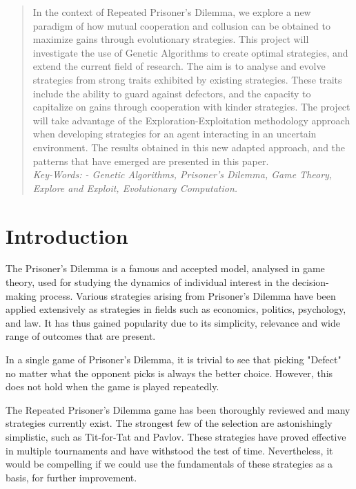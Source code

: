 \documentclass{icldt}
\numberwithin{equation}{section}       %
\begin{document}
	
\begin{abstract}
In the context of Repeated Prisoner's Dilemma, we explore a new paradigm of  how mutual cooperation and collusion can be obtained to maximize gains through evolutionary strategies. This project will investigate the use of Genetic Algorithms to create optimal strategies, and extend the current field of research. The aim is to analyse and evolve strategies from strong traits exhibited by existing strategies. These traits include the ability to guard against defectors, and the capacity to capitalize on gains through cooperation with kinder strategies. The project will take advantage of the Exploration-Exploitation methodology approach when developing strategies for an agent interacting in an uncertain environment. The results obtained in this new adapted approach, and the patterns that have emerged are presented in this paper.\\

\emph{Key-Words: - Genetic Algorithms, Prisoner's Dilemma, Game Theory, Explore and Exploit, Evolutionary Computation.}
\end{abstract}
	
	\tableofcontents
\chapter{Introduction}
The Prisoner's Dilemma is a famous and accepted model, analysed in game theory, used for studying the dynamics of individual interest in the decision-making process. Various strategies arising from Prisoner's Dilemma have been applied extensively as strategies in fields such as economics, politics, psychology, and law. It has thus gained popularity due to its simplicity, relevance and wide range of outcomes that are present. 

In a single game of Prisoner's Dilemma, it is trivial to see that picking "Defect" no matter what the opponent picks is always the better choice. However, this does not hold when the game is played repeatedly. 

The Repeated Prisoner's Dilemma game has been thoroughly reviewed and many strategies currently exist. The strongest few of the selection are astonishingly simplistic, such as Tit-for-Tat and Pavlov. These strategies have proved effective in multiple tournaments and have withstood the test of time. Nevertheless, it would be compelling if we could use the fundamentals of these strategies as a basis, for further improvement.
\end{document}

